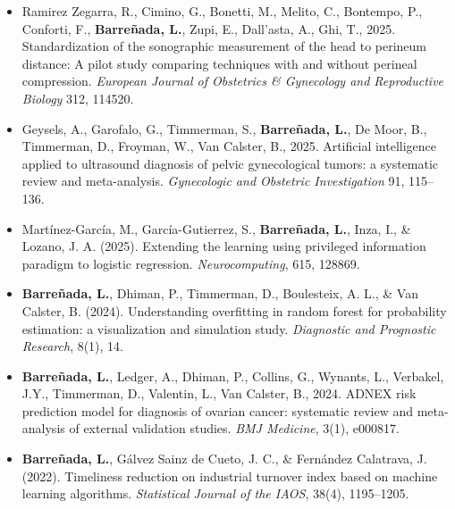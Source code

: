 \begin{itemize}
    \item Ramirez Zegarra, R., Cimino, G., Bonetti, M., Melito, C., Bontempo, P., Conforti, F., \textbf{Barreñada, L.}, Zupi, E., Dall’asta, A., Ghi, T., 2025. Standardization of the sonographic measurement of the head to perineum distance: A pilot study comparing techniques with and without perineal compression. \textit{European Journal of Obstetrics \& Gynecology and Reproductive Biology} 312, 114520.
    \item Geysels, A., Garofalo, G., Timmerman, S., \textbf{Barreñada, L.}, De Moor, B., Timmerman, D., Froyman, W., Van Calster, B., 2025. Artificial intelligence applied to ultrasound diagnosis of pelvic gynecological tumors: a systematic review and meta-analysis. \textit{Gynecologic and Obstetric Investigation} 91, 115–136.

    \item Martínez-García, M., García-Gutierrez, S., \textbf{Barreñada, L.}, Inza, I., \& Lozano, J. A. (2025). 
    Extending the learning using privileged information paradigm to logistic regression. 
    \textit{Neurocomputing}, 615, 128869.

    \item [$\blacksquare$] \textbf{Barreñada, L.}, Dhiman, P., Timmerman, D., Boulesteix, A. L., \& Van Calster, B. (2024). 
    Understanding overfitting in random forest for probability estimation: a visualization and simulation study. 
    \textit{Diagnostic and Prognostic Research}, 8(1), 14.

    \item [$\blacksquare$]  \textbf{Barreñada, L.}, Ledger, A., Dhiman, P., Collins, G., Wynants, L., Verbakel, J.Y., Timmerman, D., Valentin, L., Van Calster, B., 2024. ADNEX risk prediction model for diagnosis of ovarian cancer: systematic review and meta-analysis of external validation studies. \textit{BMJ Medicine}, 3(1), e000817.


    \item \textbf{Barreñada, L.}, Gálvez Sainz de Cueto, J. C., \& Fernández Calatrava, J. (2022). 
    Timeliness reduction on industrial turnover index based on machine learning algorithms. 
    \textit{Statistical Journal of the IAOS}, 38(4), 1195--1205.
\end{itemize}

\clearpage

\newpage 
\pagestyle{empty} 
\null 
\newpage
